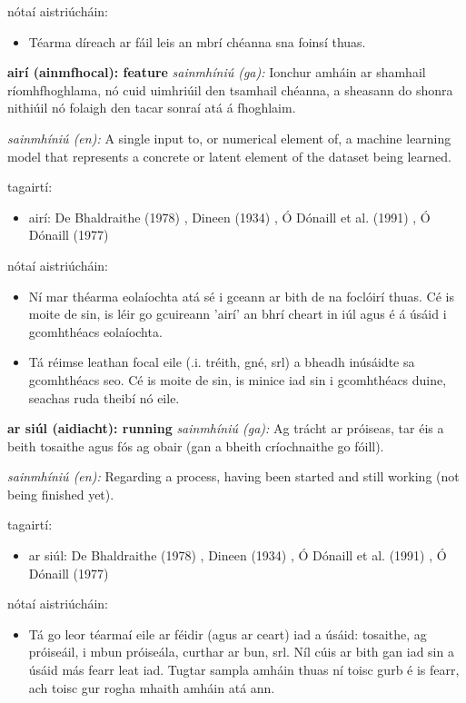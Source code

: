 \documentclass{article}
\begin{document}
nótaí aistriúcháin:
\begin{itemize}
	\item Téarma díreach ar fáil leis an mbrí chéanna sna foinsí thuas.
\end{itemize}


\textbf{airí (ainmfhocal): feature}
\textit{sainmhíniú (ga):} Ionchur amháin ar shamhail ríomhfhoghlama, nó cuid uimhriúil den tsamhail chéanna, a sheasann do shonra nithiúil nó folaigh den tacar sonraí atá á fhoghlaim.

\textit{sainmhíniú (en):} A single input to, or numerical element of, a machine learning model that represents a concrete or latent element of the dataset being learned.

tagairtí:
\begin{itemize}
	\item airí: De Bhaldraithe (1978) \cite{de-bhaldraithe}, Dineen (1934) \cite{dineen}, Ó Dónaill et al. (1991) \cite{focloir-beag}, Ó Dónaill (1977) \cite{odonaill}
\end{itemize}

nótaí aistriúcháin:
\begin{itemize}
	\item Ní mar théarma eolaíochta atá sé i gceann ar bith de na foclóirí thuas. Cé is moite de sin, is léir go gcuireann 'airí' an bhrí cheart in iúl agus é á úsáid i gcomhthéacs eolaíochta.
	\item Tá réimse leathan focal eile (.i. tréith, gné, srl) a bheadh inúsáidte sa gcomhthéacs seo. Cé is moite de sin, is minice iad sin i gcomhthéacs duine, seachas ruda theibí nó eile.
\end{itemize}


\textbf{ar siúl (aidiacht): running}
\textit{sainmhíniú (ga):} Ag trácht ar próiseas, tar éis a beith tosaithe agus fós ag obair (gan a bheith críochnaithe go fóill).

\textit{sainmhíniú (en):} Regarding a process, having been started and still working (not being finished yet).

tagairtí:
\begin{itemize}
	\item ar siúl: De Bhaldraithe (1978) \cite{de-bhaldraithe}, Dineen (1934) \cite{dineen}, Ó Dónaill et al. (1991) \cite{focloir-beag}, Ó Dónaill (1977) \cite{odonaill}
\end{itemize}

nótaí aistriúcháin:
\begin{itemize}
	\item Tá go leor téarmaí eile ar féidir (agus ar ceart) iad a úsáid: tosaithe, ag próiseáil, i mbun próiseála, curthar ar bun, srl. Níl cúis ar bith gan iad sin a úsáid más fearr leat iad. Tugtar sampla amháin thuas ní toisc gurb é is fearr, ach toisc gur rogha mhaith amháin atá ann.
\end{itemize}
\end{document}
